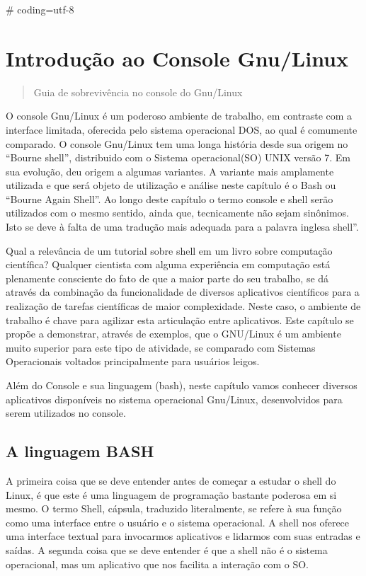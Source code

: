 \documentclass[a4paper,10pt,brazil]{sphinxmanual}
\begin{document}
\# coding=utf-8


\chapter{Introdução ao Console Gnu/Linux}
\label{bash::doc}\label{bash:introducao-ao-console-gnu-linux}\begin{quote}

Guia de sobrevivência no console do Gnu/Linux
\end{quote}

O console Gnu/Linux é um poderoso ambiente de trabalho, em
contraste com a interface limitada, oferecida pelo sistema
operacional DOS, ao qual é comumente comparado. O console Gnu/Linux
tem uma longa história desde sua origem no ``Bourne shell'',
distribuido com o Sistema operacional(SO) UNIX versão 7. Em sua
evolução, deu origem a algumas variantes. A variante mais
amplamente utilizada e que será objeto de utilização e análise
neste capítulo é o Bash ou ``Bourne Again Shell''. Ao longo deste
capítulo o termo console e shell serão utilizados com o mesmo
sentido, ainda que, tecnicamente não sejam sinônimos. Isto se deve
à falta de uma tradução mais adequada para a palavra inglesa
shell''.

Qual a relevância de um tutorial sobre shell em um livro sobre
computação científica? Qualquer cientista com alguma experiência em
computação está plenamente consciente do fato de que a maior parte
do seu trabalho, se dá através da combinação da funcionalidade de
diversos aplicativos científicos para a realização de tarefas
científicas de maior complexidade. Neste caso, o ambiente de
trabalho é chave para agilizar esta articulação entre aplicativos.
Este capítulo se propõe a demonstrar, através de exemplos, que o
GNU/Linux é um ambiente muito superior para este tipo de atividade,
se comparado com Sistemas Operacionais voltados principalmente para
usuários leigos.

Além do Console e sua linguagem (bash), neste capítulo vamos
conhecer diversos aplicativos disponíveis no sistema operacional
Gnu/Linux, desenvolvidos para serem utilizados no console.


\section{A linguagem BASH}
\label{bash:a-linguagem-bash}
A primeira coisa que se deve entender antes de começar a estudar o
shell do Linux, é que este é uma linguagem de programação bastante
poderosa em si mesmo. O termo Shell, cápsula, traduzido
literalmente, se refere à sua função como uma interface entre o
usuário e o sistema operacional. A shell nos oferece uma interface
textual para invocarmos aplicativos e lidarmos com suas entradas e
saídas. A segunda coisa que se deve entender é que a shell não é o
sistema operacional, mas um aplicativo que nos facilita a interação
com o SO.
\end{document}
